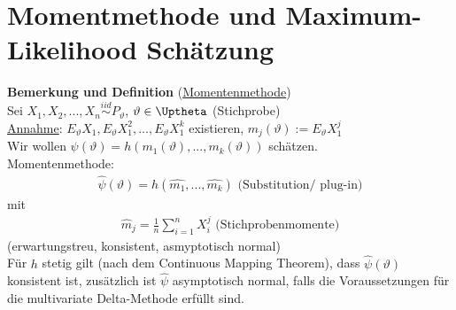 \documentclass[a4paper,openany]{book}
\theoremstyle{mytheoremstyle}
\theoremstyle{mytheoremstyle2}
\begin{document}
\chapter{Momentmethode und Maximum-Likelihood Schätzung}
\noindent \textbf{Bemerkung und Definition} (\underline{Momentenmethode})\\
  Sei $X_1,X_2,...,X_n \overset{iid}\sim P _{\vartheta }$, $\vartheta \in \Uptheta$ (Stichprobe)  \\
  \underline{Annahme}: $E _{\vartheta }X_1,E _{\vartheta }X_1^2,..., E _{\vartheta }X_1^k$ existieren, $m_j(\vartheta ):=E _{\vartheta }X_1^j$ \\
  Wir wollen $\psi (\vartheta )=h(m_1(\vartheta ),...,m_k(\vartheta ))$ schätzen. \\
  Momentenmethode: \\
  \begin{align*}
    \hat{\psi }(\vartheta )=h(\hat{m_1},...,\hat{m_k}) \text{ (Substitution/ plug-in)}
  \end{align*}
  mit 
  \begin{align*}
    \hat{m}_j=\frac{1}{n}\sum_{i=1}^{n}{X_i^j}\text{ (Stichprobenmomente)}
  \end{align*}
  (erwartungstreu, konsistent, asmyptotisch normal) \\
  Für $h$ stetig gilt (nach dem Continuous Mapping Theorem), dass $\hat{\psi }(\vartheta )$ konsistent ist, zusätzlich  ist $\hat{\psi }$ asymptotisch normal, falls die Voraussetzungen für die multivariate Delta-Methode erfüllt sind.
\end{document}
